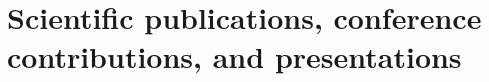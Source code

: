 \documentclass[11pt,titlepage]{article}
\begin{document}
\section{Scientific publications, conference contributions, and presentations}

\nocite{Wicaksono2014a}
\nocite{Wicaksono2014b}
\nocite{Wicaksono2014c}
\nocite{Wicaksono2015a}
\nocite{Wicaksono2015b}
\nocite{Wicaksono2015c}

\printbibliography[heading=none]

\end{document}
